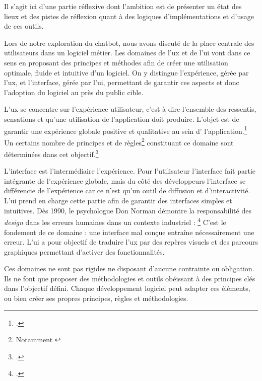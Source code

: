 
\label{uxui}

Il s'agit ici d'une partie réflexive  dont l'ambition est de présenter un état des lieux et des pistes de réflexion quant à des logiques d'implémentations et d'usage de ces outils.\newline

Lors de notre exploration du \gls{chatbot}, nous avons discuté de la place centrale des utilisateurs dans un logiciel métier. Les domaines de l'\gls{ux} et de l'\gls{ui} vont dans ce sens en proposant des principes et méthodes afin de créer une utilisation optimale, fluide et intuitive d'un logiciel. On y distingue l'expérience, gérée par l'\gls{ux}, et l'interface, gérée par l'\gls{ui}, permettant de garantir ces aspects et donc l'adoption du logiciel au près du public cible. 

L'\gls{ux} se concentre sur l'expérience utilisateur, c'est à dire l'ensemble des ressentis, sensations et  qu'une utilisation de l'application doit produire. L'objet est de garantir une expérience globale positive et qualitative au sein d' l'application.\footcite{groupeLUXDesignDefinition2022} Un certains nombre de principes et de règles\footnote{Notamment \cite{ISO92411122025}} constituant ce domaine sont déterminées dans cet objectif.\footcite{lallemandMethodesDesignUX2018}

L'interface est l'intermédiaire  l'expérience. Pour l'utilisateur l'interface fait partie intégrante de l'expérience globale, mais du côté des développeurs l'interface se différencie de l'expérience car ce n'est qu'un outil de diffusion et d'interactivité. L'\gls{ui} prend en charge cette partie afin de garantir des interfaces simples et intuitives. Dès 1990, le psychologue Don Norman démontre la responsabilité des \textit{design} dans les erreurs humaines dans un contexte industriel : \textit{}\footcite{normanDesignEverydayThings} C'est le fondement de ce domaine : une interface mal conçue entraîne nécessairement une erreur. L'\gls{ui} a pour objectif de traduire l'\gls{ux} par des repères visuels et des parcours graphiques permettant d'activer des fonctionnalités.

Ces domaines ne sont pas rigides ne disposant d'aucune contrainte ou obligation. Ils ne font que proposer des méthodologies et outils obéissant à des principes clés dans l'objectif défini. Chaque développement logiciel peut adapter ces éléments, ou bien créer ses propres principes, règles et méthodologies. 

